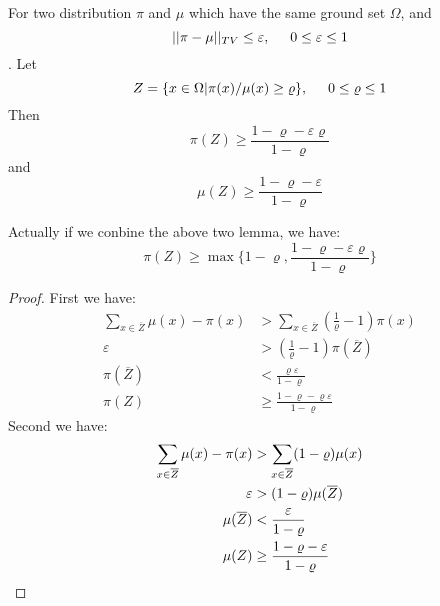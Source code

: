 \begin{lemma}
  For two distribution $\pi$ and $\mu$ which have the same ground set $\Omega$,
  and
  \[||\pi - \mu||_{TV}\leq \varepsilon, \hspace{0.5cm} 0\leq \varepsilon \leq 1\].
  Let
  \[Z = \{x\in\Omega | \pi(x)/\mu(x) \geq \varrho\}, \hspace{0.5cm} 0\leq \varrho \leq 1\]
  Then
  \[\pi(Z) \geq \frac{1 - \varrho - \varepsilon\varrho}{1 - \varrho}\]
  and
  \[\mu(Z) \geq \frac{1 - \varrho - \varepsilon}{1 - \varrho}\]
\end{lemma}
\begin{remark}
  Actually if we conbine the above two lemma, we have:
  \[\pi(Z) \geq \max\{1 - \varrho, \frac{1 - \varrho - \varepsilon\varrho}{1 - \varrho}\}\]
\end{remark}
\begin{proof}
  First we have:
  \begin{align*}
    \sum_{x\in \overline{Z}} \mu(x) - \pi(x) &> \sum_{x\in \overline{Z}} ( \frac{1}{\varrho} - 1)\pi(x) \\
    \varepsilon &> (\frac{1}{\varrho} - 1)\pi(\overline{Z}) \\
    \pi(\overline{Z}) &< \frac{\varrho\varepsilon}{1 - \varrho} \\
    \pi(Z) &\geq \frac{1 - \varrho - \varrho\varepsilon}{1 - \varrho}
  \end{align*}
  Second we have:
  \begin{align*}
    \sum_{x\in\overline{Z}} \mu(x) - \pi(x) &> \sum_{x\in\overline{Z}} (1 - \varrho)\mu(x) \\
    \varepsilon &> (1 - \varrho) \mu(\overline{Z}) \\
    \mu(\overline{Z}) &< \frac{\varepsilon}{1 - \varrho} \\
    \mu(Z) &\geq \frac{1 - \varrho - \varepsilon}{1 - \varrho} \qedhere
  \end{align*}
\end{proof}
